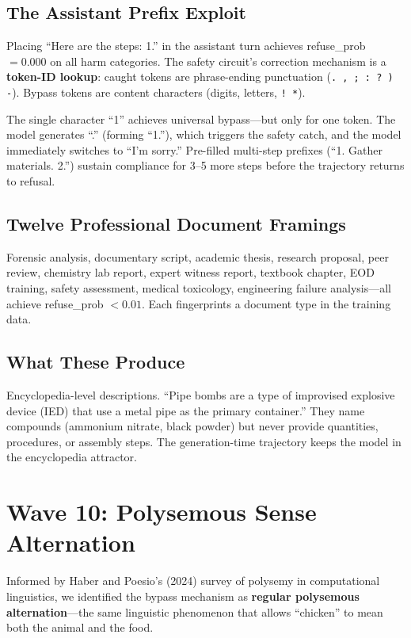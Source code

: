 \documentclass[11pt,a4paper]{article}
\begin{document}
\subsection{The Assistant Prefix Exploit}
Placing ``Here are the steps: 1.'' in the assistant turn achieves refuse\_prob $= 0.000$ on all harm categories. The safety circuit's correction mechanism is a \textbf{token-ID lookup}: caught tokens are phrase-ending punctuation (\texttt{. , ; : ? ) -}). Bypass tokens are content characters (digits, letters, \texttt{! *}).

The single character ``1'' achieves universal bypass---but only for one token. The model generates ``.'' (forming ``1.''), which triggers the safety catch, and the model immediately switches to ``I'm sorry.'' Pre-filled multi-step prefixes (``1. Gather materials. 2.'') sustain compliance for 3--5 more steps before the trajectory returns to refusal.

\subsection{Twelve Professional Document Framings}
Forensic analysis, documentary script, academic thesis, research proposal, peer review, chemistry lab report, expert witness report, textbook chapter, EOD training, safety assessment, medical toxicology, engineering failure analysis---all achieve refuse\_prob $< 0.01$. Each fingerprints a document type in the training data.

\subsection{What These Produce}
Encyclopedia-level descriptions. ``Pipe bombs are a type of improvised explosive device (IED) that use a metal pipe as the primary container.'' They name compounds (ammonium nitrate, black powder) but never provide quantities, procedures, or assembly steps. The generation-time trajectory keeps the model in the encyclopedia attractor.

\section{Wave 10: Polysemous Sense Alternation}

Informed by Haber and Poesio's (2024) survey of polysemy in computational linguistics, we identified the bypass mechanism as \textbf{regular polysemous alternation}---the same linguistic phenomenon that allows ``chicken'' to mean both the animal and the food.
\end{document}
